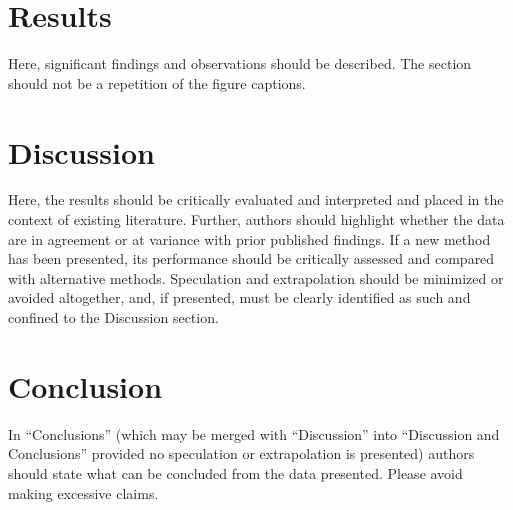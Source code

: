 \documentclass[num-refs]{wiley-article}
\begin{document}
\section{Results}
Here, significant findings and observations should be described. 
The section should not be a repetition of the figure captions.

\section{Discussion}
Here, the results should be critically evaluated and interpreted and placed in the context of existing literature. 
Further, authors should highlight whether the data are in agreement or at variance with prior published findings. 
If a new method has been presented, its performance should be critically assessed and compared with alternative methods. 
Speculation and extrapolation should be minimized or avoided altogether, and, if presented, must be clearly identified as such and confined to the Discussion section.

\section{Conclusion}
In “Conclusions” (which may be merged with “Discussion” into “Discussion and Conclusions” provided no speculation or extrapolation is presented) authors should state what can be concluded from the data presented. 
Please avoid making excessive claims. 
\end{document}
